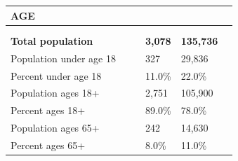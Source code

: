 \documentclass[9pt]{report}
\begin{document}
\vspace{24pt}
\setlength{\tabcolsep}{.01in} %
\begin{tabular}{p{.10in}p{.10in}p{.10in}p{3.7in}>{\hfill}p{.85in}>{\hfill}p{.85in}>{\hfill}p{.85in}>{\hfill}p{.85in}p{0.1in}}
\multicolumn{9}{l}{\parbox{7.1in}{\raggedright{\large{\strut\textbf{AGE}\strut}}}} \\ 
\hline
\multicolumn{4}{l}{\parbox{3.5in}{\raggedright{\textbf{}}}} & \multicolumn{1}{r}{\parbox{.85in}{\strut\raggedleft{\textbf{}\strut}}} & \multicolumn{1}{r}{\parbox{.85in}{\strut\raggedleft{\textbf{}\strut}}} & \multicolumn{1}{r}{\parbox{.85in}{\strut{}}} & \multicolumn{1}{r}{\parbox{.85in}{\strut{}}} & \\ 
\multicolumn{9}{l}{} \\ 
\multicolumn{4}{l}{\parbox{3.5in}{\strut\raggedright{\textbf{Total population}\strut}}} & \textbf{} & \textbf{} & \textbf{3,078} & \textbf{135,736} & \textbf{} \\ 
\multicolumn{4}{l}{\parbox{3.6in}{\strut\raggedright{{Population under age 18}}\strut}} &  &  & 327 & 29,836 & \multicolumn{1}{l}{}  \\ 
\multicolumn{4}{l}{\parbox{3.6in}{\strut\raggedright{{Percent under age 18}}\strut}} &  &  & 11.0\% & 22.0\% & \multicolumn{1}{l}{}  \\ 
\multicolumn{4}{l}{\parbox{3.6in}{\strut\raggedright{{Population ages 18+}}\strut}} &  &  & 2,751 & 105,900 & \multicolumn{1}{l}{}  \\ 
\multicolumn{4}{l}{\parbox{3.6in}{\strut\raggedright{{Percent ages 18+}}\strut}} &  &  & 89.0\% & 78.0\% & \multicolumn{1}{l}{}  \\ 
\multicolumn{4}{l}{\parbox{3.6in}{\strut\raggedright{{Population ages 65+}}\strut}} &  &  & 242 & 14,630 & \multicolumn{1}{l}{}  \\ 
\multicolumn{4}{l}{\parbox{3.6in}{\strut\raggedright{{Percent ages 65+}}\strut}} &  &  & 8.0\% & 11.0\% & \multicolumn{1}{l}{}  \\ 

\end{tabular}
\setlength{\tabcolsep}{6pt} %
\end{document}
